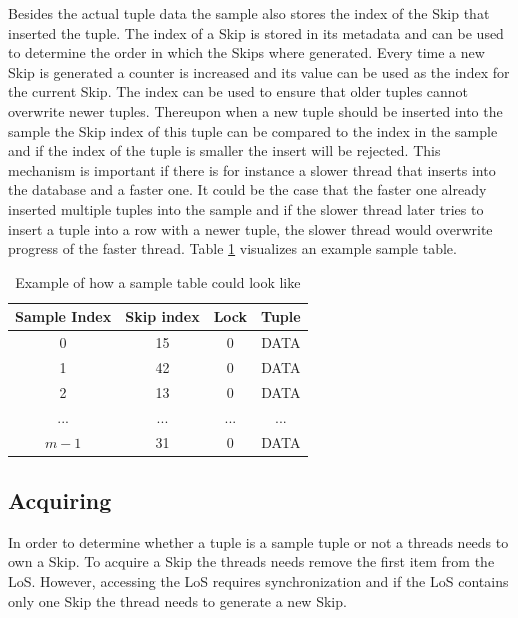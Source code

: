 \documentclass[sigconf,nonacm]{acmart}
\begin{document}
        Besides the actual tuple data the sample also stores the index of the Skip that inserted the tuple. The index of a Skip is stored in its metadata and can be used to determine the order in which the Skips where generated. Every time a new Skip is generated a counter is increased and its value can be used as the index for the current Skip.
        The index can be used to ensure that older tuples cannot overwrite newer tuples. Thereupon when a new tuple should be inserted into the sample the Skip index of this tuple can be compared to the index in the sample and if the index of the tuple is smaller the insert will be rejected. This mechanism is important if there is for instance a slower thread that inserts into the database and a faster one. It could be the case that the faster one already inserted multiple tuples into the sample and if the slower thread later tries to insert a tuple into a row with a newer tuple, the slower thread would overwrite progress of the faster thread. Table \ref{tab:sample} visualizes an example sample table.
        \begin{table}[H]
            \begin{tabular}{| c | c | c | c|} 
                \hline
                Sample Index & Skip index & Lock & Tuple \\
                \hline
                \hline
                0 & 15 & 0 & DATA \\
                \hline
                1 & 42 & 0 & DATA \\
                \hline
                2 & 13 & 0 & DATA \\
                \hline
                ... & ... & ... & ... \\
                \hline
                $m - 1$ & 31 & 0 & DATA \\
                \hline
            \end{tabular}
            \vspace{5mm}
            \caption{Example of how a sample table could look like}
            \label{tab:sample}
        \end{table}

    \subsection{Acquiring}
        In order to determine whether a tuple is a sample tuple or not a threads needs to own a Skip. To acquire a Skip the threads needs remove the first item from the LoS. However, accessing the LoS requires synchronization and if the LoS contains only one Skip the thread needs to generate a new Skip.
\end{document}

